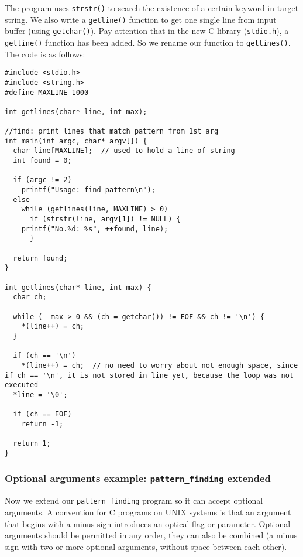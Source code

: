 \documentclass[12pt]{article}
\begin{document}
The program uses \texttt{strstr()} to search the existence of a certain keyword in target string. We also write a \texttt{getline()} function to get one single line from input buffer (using \texttt{getchar()}). Pay attention that in the new C library (\texttt{stdio.h}), a \texttt{getline()} function has been added. So we rename our function to \texttt{getlines()}. The code is as follows:
\begin{verbatim}
#include <stdio.h>
#include <string.h>
#define MAXLINE 1000

int getlines(char* line, int max);

//find: print lines that match pattern from 1st arg 
int main(int argc, char* argv[]) {
  char line[MAXLINE];  // used to hold a line of string
  int found = 0;

  if (argc != 2)
    printf("Usage: find pattern\n");
  else
    while (getlines(line, MAXLINE) > 0)
      if (strstr(line, argv[1]) != NULL) {
	printf("No.%d: %s", ++found, line);
      }

  return found;
}

int getlines(char* line, int max) {
  char ch;

  while (--max > 0 && (ch = getchar()) != EOF && ch != '\n') {
    *(line++) = ch;
  }

  if (ch == '\n')
    *(line++) = ch;  // no need to worry about not enough space, since if ch == '\n', it is not stored in line yet, because the loop was not executed
  *line = '\0';

  if (ch == EOF)
    return -1;

  return 1;
}
\end{verbatim}

\subsubsection{Optional arguments example: \texttt{pattern\_finding} extended}
\label{sec:org076e1a2}
Now we extend our \texttt{pattern\_finding} program so it can accept optional arguments. A convention for C programs on UNIX systems is that an argument that begins with a minus sign introduces an optical flag or parameter. Optional arguments should be permitted in any order, they can also be combined (a minus sign with two or more optional arguments, without space between each other).
\end{document}
